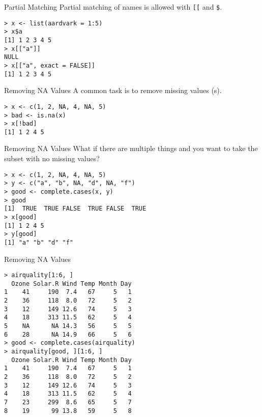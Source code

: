\documentclass[aspectratio=169]{beamer}
\begin{document}
\begin{frame}[fragile]{Partial Matching}
Partial matching of names is allowed with \verb+[[+ and \verb+$+.
\begin{verbatim}
> x <- list(aardvark = 1:5)
> x$a
[1] 1 2 3 4 5
> x[["a"]]
NULL
> x[["a", exact = FALSE]]
[1] 1 2 3 4 5
\end{verbatim}
\end{frame}

\begin{frame}[fragile]{Removing NA Values}
A common task is to remove missing values (s).
\begin{verbatim}
> x <- c(1, 2, NA, 4, NA, 5)
> bad <- is.na(x)
> x[!bad]
[1] 1 2 4 5
\end{verbatim}
\end{frame}

\begin{frame}[fragile]{Removing NA Values}
What if there are multiple things and you want to take the subset with
no missing values?
\begin{verbatim}
> x <- c(1, 2, NA, 4, NA, 5)
> y <- c("a", "b", NA, "d", NA, "f")
> good <- complete.cases(x, y)
> good
[1]  TRUE  TRUE FALSE  TRUE FALSE  TRUE
> x[good]
[1] 1 2 4 5
> y[good]
[1] "a" "b" "d" "f"
\end{verbatim}
\end{frame}

\begin{frame}[fragile]{Removing NA Values}
\begin{verbatim}
> airquality[1:6, ]
  Ozone Solar.R Wind Temp Month Day
1    41     190  7.4   67     5   1
2    36     118  8.0   72     5   2
3    12     149 12.6   74     5   3
4    18     313 11.5   62     5   4
5    NA      NA 14.3   56     5   5
6    28      NA 14.9   66     5   6
> good <- complete.cases(airquality)
> airquality[good, ][1:6, ]
  Ozone Solar.R Wind Temp Month Day
1    41     190  7.4   67     5   1
2    36     118  8.0   72     5   2
3    12     149 12.6   74     5   3
4    18     313 11.5   62     5   4
7    23     299  8.6   65     5   7
8    19      99 13.8   59     5   8
\end{verbatim}
\end{frame}
\end{document}
